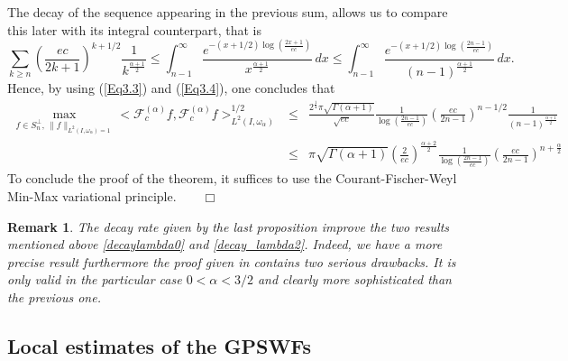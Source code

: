 \documentclass[]{article}
\newtheorem{remark}{Remark}
\begin{document}
The decay of the sequence appearing in the previous sum, allows us to compare this later with its integral counterpart, that is
\begin{equation}\label{Eq3.4}
\sum_{k\geq n} \left(\frac{ec}{2k+1}\right)^{k+1/2}\frac{1}{k^{\frac{\alpha+1}{2}}}
\leq \int_{n-1}^{\infty}\frac{ e^{-(x+1/2) \log(\frac{2x+1}{ec})}}{x^{\frac{\alpha+1}{2}}}\, dx\leq
\int_{n-1}^{\infty}\frac{ e^{-(x+1/2)\log(\frac{2n-1}{ec})}}{(n-1)^{\frac{\alpha+1}{2}}}\, dx.
\end{equation}
Hence, by using (\ref{Eq3.3}) and (\ref{Eq3.4}), one concludes that
\begin{eqnarray}
\max_{f\in S_n^{\perp},\, \|f\|_{L^2(I,\omega_{\alpha})=1}} < \mathcal F_c^{(\alpha)} f, \mathcal F_c^{(\alpha)} f>^{1/2}_{L^2(I,\omega_{\alpha})}&\leq &\frac{2^\frac{1}{4}\pi \sqrt{\Gamma(\alpha+1)}}{\sqrt{ec}} \frac{1}{\log(\frac{2n-1}{ec})} \left(\frac{ec}{2n-1}\right)^{n-1/2}\frac{1}{(n-1)^{\frac{\alpha+1}{2}}}\nonumber\\
&\leq&\pi \sqrt{\Gamma(\alpha+1)} \left(\frac{2}{ec}\right)^{\frac{\alpha+2}{2}} \frac{1}{\log(\frac{2n-1}{ec})} \left(\frac{ec}{2n-1}\right)^{n+\frac{\alpha}{2}}\label{Eq3.5}
\end{eqnarray}
To conclude the proof of the theorem, it suffices to use the Courant-Fischer-Weyl Min-Max variational principle.$\qquad \Box $


\begin{remark}
	The decay rate given by the last proposition improve the two results mentioned above \eqref{decaylambda0} and \eqref{decay_lambda2}. Indeed, we have a more precise result furthermore the proof given in \cite{Karoui-Souabni2} contains two serious drawbacks. It is only valid in the particular case $0 < \alpha < 3/2 $ and clearly more sophisticated than the previous one.
\end{remark}

\subsection{Local estimates of the GPSWFs}
\end{document}
